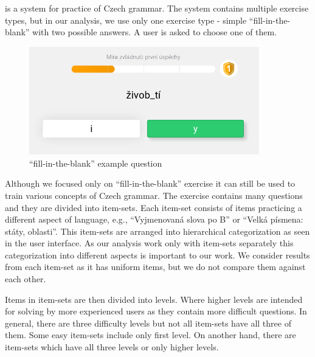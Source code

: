 \documentclass[
  digital, %
  table,   %
  nolof,     %
  nolot,     %
  nocover
]{fithesis3}
\begin{document}
\section{\umimeCesky{}}\label{umime-cesky}


\href{https://umimecesky.cz/}{\umimeCesky{}} is a system for practice of Czech grammar. The system contains multiple exercise types, but in our analysis, we use only one exercise type - simple ``fill-in-the-blank'' with two possible answers. A user is asked to choose one of them.

\begin{figure}
  \includegraphics[width=10cm]{img/umimecesky_doplnovacka}
  \caption{``fill-in-the-blank'' example question}
  \label{fig:umimeceskydoplnovacka}
\end{figure}

Although we focused only on ``fill-in-the-blank'' exercise it can still be used to train various concepts of Czech grammar. The exercise contains many questions and they are divided into item-sets. Each item-set consists of items practicing a different aspect of language, e.g., ``Vyjmenovaná slova po B'' or ``Velká písmena: státy, oblasti''. This item-sets are arranged into hierarchical categorization as seen in the user interface. As our analysis work only with item-sets separately this categorization into different aspects is important to our work. We consider results from each item-set as it has uniform items, but we do not compare them against each other.

Items in item-sets are then divided into levels. Where higher levels are intended for solving by more experienced users as they contain more difficult questions. In general, there are three difficulty levels but not all item-sets have all three of them. Some easy item-sets include only first level. On another hand, there are item-sets which have all three levels or only higher levels.

\end{document}
